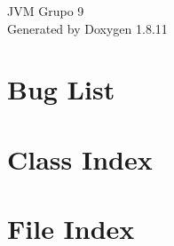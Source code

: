 \documentclass[twoside]{book}
\newcommand{\+}{\discretionary{\mbox{\scriptsize$\hookleftarrow$}}{}{}}
\newcommand{\clearemptydoublepage}{%
  \newpage{\pagestyle{empty}\cleardoublepage}%
}
\begin{document}
\hypersetup{pageanchor=false,
             bookmarksnumbered=true,
             pdfencoding=unicode
            }
\begin{titlepage}
\vspace*{7cm}
\begin{center}%
{\Large J\+VM Grupo 9 }\\
\vspace*{1cm}
{\large Generated by Doxygen 1.8.11}\\
\end{center}
\end{titlepage}
\clearemptydoublepage
\tableofcontents
\clearemptydoublepage
{}
\hypersetup{pageanchor=true}

\chapter{Bug List}
\label{bug}
\hypertarget{bug}{}

\chapter{Class Index}

\chapter{File Index}

\end{document}

